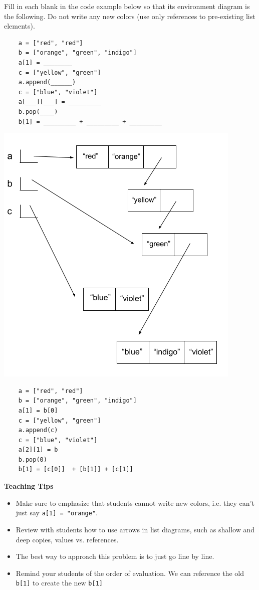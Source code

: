 \begin{blocksection}
    \question Fill in each blank in the code example below so that its environment diagram is the following. Do not write any new colors (use only references to pre-existing list elements).
    
    \begin{multicols}{2}
    \begin{lstlisting}
    a = ["red", "red"]
    b = ["orange", "green", "indigo"]
    a[1] = ________
    c = ["yellow", "green"]
    a.append(______)
    c = ["blue", "violet"]
    a[___][___] = _________
    b.pop(____)
    b[1] = _________ + _________ + _________
    \end{lstlisting}
    
    \columnbreak
    \includegraphics[width=.45\textwidth]{rainbow_connection.png}
    \end{multicols}
    
    \begin{solution}[2in]
    \begin{lstlisting}
    a = ["red", "red"]
    b = ["orange", "green", "indigo"]
    a[1] = b[0]
    c = ["yellow", "green"]
    a.append(c)
    c = ["blue", "violet"]
    a[2][1] = b
    b.pop(0)
    b[1] = [c[0]]  + [b[1]] + [c[1]]
    \end{lstlisting}
    \end{solution}
    \end{blocksection}
    
    \begin{blocksection}
    \begin{guide}
    \textbf{Teaching Tips}
    \begin{itemize}
        \item Make sure to emphasize that students cannot write new colors, i.e. they can't just say \lstinline{a[1] = "orange"}.
        \item Review with students how to use arrows in list diagrams, such as shallow and deep copies, values vs. references.
        \item The best way to approach this problem is to just go line by line.
        \item Remind your students of the order of evaluation. We can reference the old \lstinline{b[1]} to create the new \lstinline{b[1]}
    \end{itemize}
    \end{guide}
    \end{blocksection}
    